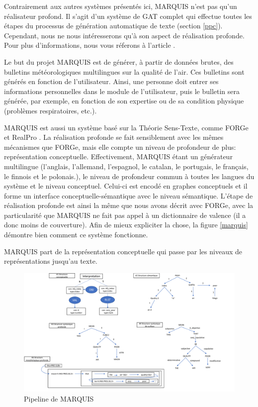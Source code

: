 Contrairement aux autres systèmes présentés ici, MARQUIS n'est pas qu'un réalisateur profond. Il s'agit d'un système de \ac{GAT} complet qui effectue toutes les étapes du processus de génération automatique de texte (section \ref{ppc}). Cependant, nous ne nous intéresserons qu'à son aspect de réalisation profonde. Pour plus d'informations, nous vous réferons à l'article \citep{WannerMARQUISGENERATIONUSERTAILORED2010}. 

Le but du projet MARQUIS est de générer, à partir de données brutes, des bulletins météorologiques multilingues sur la qualité de l'air. Ces bulletins sont générés en fonction de l'utilisateur. Ainsi, une personne doit entrer ses informations personnelles dans le module de l'utilisateur, puis le bulletin sera générée, par exemple, en fonction de son expertise ou de sa condition physique (problèmes respiratoires, etc.).

MARQUIS est aussi un système basé sur la Théorie Sens-Texte, comme FORGe \citep{MilledemoFORGePompeu2017} et RealPro \citep{LavoieFastPortableRealizer1997}. La réalisation profonde se fait sensiblement avec les mêmes mécanismes que FORGe, mais elle compte un niveau de profondeur de plus: représentation conceptuelle. Effectivement, MARQUIS étant un générateur multilingue (l'anglais, l'allemand, l'espagnol, le catalan, le portugais, le français, le finnois et le polonais.), le niveau de profondeur commun à toutes les langues du système et le niveau conceptuel. Celui-ci est encodé en graphes conceptuels et il forme un interface conceptuelle-sémantique avec le niveau sémantique. L'étape de réalisation profonde est ainsi la même que nous avons décrit avec FORGe, avec la particularité que MARQUIS ne fait pas appel à un dictionnaire de valence (il a donc moins de couverture). Afin de mieux expliciter la chose, la figure \ref{marquis} démontre bien comment ce système fonctionne.

MARQUIS part de la représentation conceptuelle qui passe par les niveaux de représentations jusqu'au texte.

\begin{figure}[htb]
	\centering
	\includegraphics[width=1\textwidth, trim = {0cm 0cm 0cm 0cm},clip]{ch2/figs/marquis.pdf}
	\caption{Pipeline de MARQUIS}
	\label{fig:marquis}
\end{figure}

